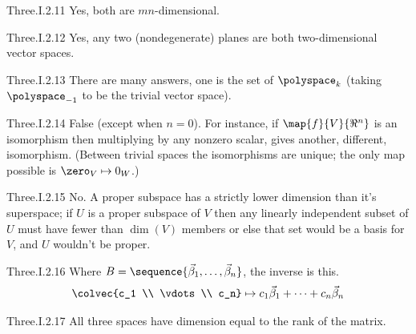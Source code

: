 \begin{ans}{Three.I.2.11}
      Yes, both are \( mn \)-dimensional.
    
\end{ans}
\begin{ans}{Three.I.2.12}
      Yes, any two (nondegenerate) planes are both two-dimensional
      vector spaces.
    
\end{ans}
\begin{ans}{Three.I.2.13}
        There are many answers, one is the set of \( \polyspace_k \)
        (taking \( \polyspace_{-1} \) to be the trivial vector space).
     
\end{ans}
\begin{ans}{Three.I.2.14}
      False  (except when \( n=0 \)).
      For instance,
      if \( \map{f}{V}{\Re^n} \) is an isomorphism then multiplying by any
      nonzero scalar, gives another, different, isomorphism.
      (Between trivial spaces the isomorphisms are unique; the only map
      possible is $\zero_V\mapsto 0_W$.)
    
\end{ans}
\begin{ans}{Three.I.2.15}
      No.
      A proper subspace has a strictly lower dimension than it's superspace;
      if $U$ is a proper subspace of $V$ then any linearly independent subset
      of $U$ must have fewer than $\dim(V)$ members or else that set would
      be a basis for $V$, and $U$ wouldn't be proper.
    
\end{ans}
\begin{ans}{Three.I.2.16}
      Where \( B=\sequence{\vec{\beta}_1,\ldots,\vec{\beta}_n} \), the
      inverse is this.
      \begin{equation*}
        \colvec{c_1 \\ \vdots \\ c_n}
        \mapsto c_1\vec{\beta}_1+\cdots+c_n\vec{\beta}_n
      \end{equation*}
    
\end{ans}
\begin{ans}{Three.I.2.17}
      All three spaces have dimension equal to the rank of the matrix.
    
\end{ans}

